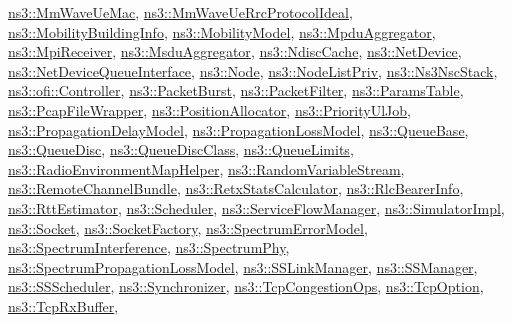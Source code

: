 \hyperlink{classns3_1_1MmWaveUeMac}{ns3\+::\+Mm\+Wave\+Ue\+Mac}, \hyperlink{classns3_1_1MmWaveUeRrcProtocolIdeal}{ns3\+::\+Mm\+Wave\+Ue\+Rrc\+Protocol\+Ideal}, \hyperlink{classns3_1_1MobilityBuildingInfo}{ns3\+::\+Mobility\+Building\+Info}, \hyperlink{classns3_1_1MobilityModel}{ns3\+::\+Mobility\+Model}, \hyperlink{classns3_1_1MpduAggregator}{ns3\+::\+Mpdu\+Aggregator}, \hyperlink{classns3_1_1MpiReceiver}{ns3\+::\+Mpi\+Receiver}, \hyperlink{classns3_1_1MsduAggregator}{ns3\+::\+Msdu\+Aggregator}, \hyperlink{classns3_1_1NdiscCache}{ns3\+::\+Ndisc\+Cache}, \hyperlink{classns3_1_1NetDevice}{ns3\+::\+Net\+Device}, \hyperlink{classns3_1_1NetDeviceQueueInterface}{ns3\+::\+Net\+Device\+Queue\+Interface}, \hyperlink{classns3_1_1Node}{ns3\+::\+Node}, \hyperlink{classns3_1_1NodeListPriv}{ns3\+::\+Node\+List\+Priv}, \hyperlink{classns3_1_1Ns3NscStack}{ns3\+::\+Ns3\+Nsc\+Stack}, \hyperlink{classns3_1_1ofi_1_1Controller}{ns3\+::ofi\+::\+Controller}, \hyperlink{classns3_1_1PacketBurst}{ns3\+::\+Packet\+Burst}, \hyperlink{classns3_1_1PacketFilter}{ns3\+::\+Packet\+Filter}, \hyperlink{structns3_1_1ParamsTable}{ns3\+::\+Params\+Table}, \hyperlink{classns3_1_1PcapFileWrapper}{ns3\+::\+Pcap\+File\+Wrapper}, \hyperlink{classns3_1_1PositionAllocator}{ns3\+::\+Position\+Allocator}, \hyperlink{classns3_1_1PriorityUlJob}{ns3\+::\+Priority\+Ul\+Job}, \hyperlink{classns3_1_1PropagationDelayModel}{ns3\+::\+Propagation\+Delay\+Model}, \hyperlink{classns3_1_1PropagationLossModel}{ns3\+::\+Propagation\+Loss\+Model}, \hyperlink{classns3_1_1QueueBase}{ns3\+::\+Queue\+Base}, \hyperlink{classns3_1_1QueueDisc}{ns3\+::\+Queue\+Disc}, \hyperlink{classns3_1_1QueueDiscClass}{ns3\+::\+Queue\+Disc\+Class}, \hyperlink{classns3_1_1QueueLimits}{ns3\+::\+Queue\+Limits}, \hyperlink{classns3_1_1RadioEnvironmentMapHelper}{ns3\+::\+Radio\+Environment\+Map\+Helper}, \hyperlink{classns3_1_1RandomVariableStream}{ns3\+::\+Random\+Variable\+Stream}, \hyperlink{classns3_1_1RemoteChannelBundle}{ns3\+::\+Remote\+Channel\+Bundle}, \hyperlink{classns3_1_1RetxStatsCalculator}{ns3\+::\+Retx\+Stats\+Calculator}, \hyperlink{classns3_1_1RlcBearerInfo}{ns3\+::\+Rlc\+Bearer\+Info}, \hyperlink{classns3_1_1RttEstimator}{ns3\+::\+Rtt\+Estimator}, \hyperlink{classns3_1_1Scheduler}{ns3\+::\+Scheduler}, \hyperlink{classns3_1_1ServiceFlowManager}{ns3\+::\+Service\+Flow\+Manager}, \hyperlink{classns3_1_1SimulatorImpl}{ns3\+::\+Simulator\+Impl}, \hyperlink{classns3_1_1Socket}{ns3\+::\+Socket}, \hyperlink{classns3_1_1SocketFactory}{ns3\+::\+Socket\+Factory}, \hyperlink{classns3_1_1SpectrumErrorModel}{ns3\+::\+Spectrum\+Error\+Model}, \hyperlink{classns3_1_1SpectrumInterference}{ns3\+::\+Spectrum\+Interference}, \hyperlink{classns3_1_1SpectrumPhy}{ns3\+::\+Spectrum\+Phy}, \hyperlink{classns3_1_1SpectrumPropagationLossModel}{ns3\+::\+Spectrum\+Propagation\+Loss\+Model}, \hyperlink{classns3_1_1SSLinkManager}{ns3\+::\+S\+S\+Link\+Manager}, \hyperlink{classns3_1_1SSManager}{ns3\+::\+S\+S\+Manager}, \hyperlink{classns3_1_1SSScheduler}{ns3\+::\+S\+S\+Scheduler}, \hyperlink{classns3_1_1Synchronizer}{ns3\+::\+Synchronizer}, \hyperlink{classns3_1_1TcpCongestionOps}{ns3\+::\+Tcp\+Congestion\+Ops}, \hyperlink{classns3_1_1TcpOption}{ns3\+::\+Tcp\+Option}, \hyperlink{classns3_1_1TcpRxBuffer}{ns3\+::\+Tcp\+Rx\+Buffer}, 